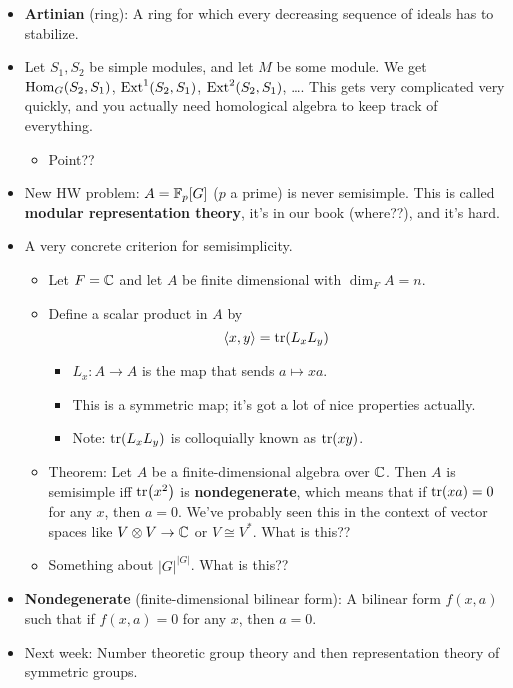 \documentclass[../notes.tex]{subfiles}
\begin{document}
\begin{itemize}
\begin{proof}
\begin{equation*}
        \end{equation*}
        But then $f$ is injective. This combined with the fact that $A/L_1\oplus\cdots\oplus A/L_n$ is semisimple by definition means that ${}_AA$ is isomorphic to a submodule of a semisimple module. Thus, since the only submodules of a semisimple module are mix-and-match combinations of the semisimple module's constituent simple modules, ${}_AA$ is semisimple itself. Therefore, by the semisimple algebra conditions from Wednesday's class, $A$ is semisimple.
    \end{proof}
    \item \textbf{Artinian} (ring): A ring for which every decreasing sequence of ideals has to stabilize.
    \item Let $S_1,S_2$ be simple modules, and let $M$ be some module. We get $\operatorname{Hom}_G(S_2,S_1)$, $\operatorname{Ext}^1(S_2,S_1)$, $\operatorname{Ext}^2(S_2,S_1)$, \dots. This gets very complicated very quickly, and you actually need homological algebra to keep track of everything.
    \begin{itemize}
        \item Point??
    \end{itemize}
    \item New HW problem: $A=\mathbb{F}_p[G]$ ($p$ a prime) is never semisimple. This is called \textbf{modular representation theory}, it's in our book (where??), and it's hard.
    \item A very concrete criterion for semisimplicity.
    \begin{itemize}
        \item Let $F=\mathbb{C}$ and let $A$ be finite dimensional with $\dim_FA=n$.
        \item Define a scalar product in $A$ by
        \begin{equation*}
            \left\langle{x,y}\right\rangle = \tr(L_xL_y)
        \end{equation*}
        \begin{itemize}
            \item $L_x:A\to A$ is the map that sends $a\mapsto xa$.
            \item This is a symmetric map; it's got a lot of nice properties actually.
            \item Note: $\tr(L_xL_y)$ is colloquially known as $\tr(xy)$.
        \end{itemize}
        \item Theorem: Let $A$ be a finite-dimensional algebra over $\mathbb{C}$. Then $A$ is semisimple iff $\tr(x^2)$ is \textbf{nondegenerate}, which means that if $\tr(xa)=0$ for any $x$, then $a=0$. We've probably seen this in the context of vector spaces like $V\otimes V\to\mathbb{C}$ or $V\cong V^*$. What is this??
        \item Something about $|G|^{|G|}$. What is this??
    \end{itemize}
    \item \textbf{Nondegenerate} (finite-dimensional bilinear form): A bilinear form $f(x,a)$ such that if $f(x,a)=0$ for any $x$, then $a=0$.
    \item Next week: Number theoretic group theory and then representation theory of symmetric groups.
\end{itemize}
\end{document}
